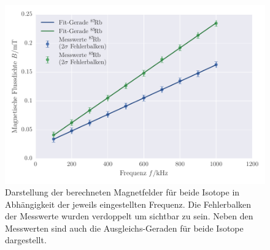 \FloatBarrier
\begin{figure}[!h]
\centering
\includegraphics[scale=0.85]{../Grafiken/Resonanzstellen.pdf}
\caption{Darstellung der berechneten Magnetfelder für beide Isotope in Abhängigkeit der 
	jeweils eingestellten Frequenz. Die Fehlerbalken der Messwerte wurden verdoppelt um sichtbar zu sein.
	Neben den Messwerten sind auch die Ausgleichs-Geraden für beide Isotope dargestellt. \label{fig:resonanzstellen}}
\end{figure}
\FloatBarrier